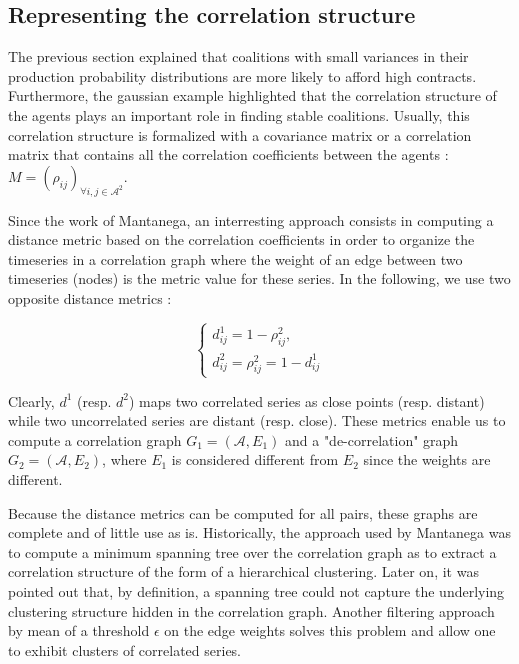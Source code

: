 \documentclass[conference]{IEEEtran}
\begin{document}
\subsection{Representing the correlation structure}

The previous section explained that coalitions with small variances in their production probability distributions are more likely to afford high contracts. Furthermore, the gaussian example highlighted that the correlation structure of the agents plays an important role in finding stable coalitions. Usually, this correlation structure is formalized with a covariance matrix or a correlation matrix that contains all the correlation coefficients between the agents : $ M = (\rho_{ij})_{\forall i,j \in \mathcal{A}^{2}}$.

Since the work of Mantanega, an interresting approach consists in computing a distance metric based on the correlation coefficients in order to organize the timeseries in a correlation graph where the weight of an edge between two timeseries (nodes) is the metric value for these series. In the following, we use two opposite distance metrics : 

\begin{equation}
\left\{ \begin{array}{lll}
			d_{ij}^{1} = 1 - \rho_{ij}^{2}, \\
			d_{ij}^{2} = \rho_{ij}^{2} = 1 - d_{ij}^{1}
\end{array} \right.
\end{equation}

Clearly, $ d^{1} $ (resp. $ d^{2} $) maps two correlated series as close points (resp. distant) while two uncorrelated series are distant (resp. close). These metrics enable us to compute a correlation graph $ G_{1} = (\mathcal{A}, E_{1}) $ and a "de-correlation" graph $ G_{2} = (\mathcal{A}, E_{2} ) $, where $ E_{1} $ is considered different from $ E_{2} $ since the weights are different. 

Because the distance metrics can be computed for all pairs, these graphs are complete and of little use as is. Historically, the approach used by Mantanega was to compute a minimum spanning tree over the correlation graph as to extract a correlation structure of the form of a hierarchical clustering. Later on, it was pointed out that, by definition, a spanning tree could not capture the underlying clustering structure hidden in the correlation graph. Another filtering approach by mean of a threshold $ \epsilon $ on the edge weights solves this problem and allow one to exhibit clusters of correlated series. 
\end{document}
